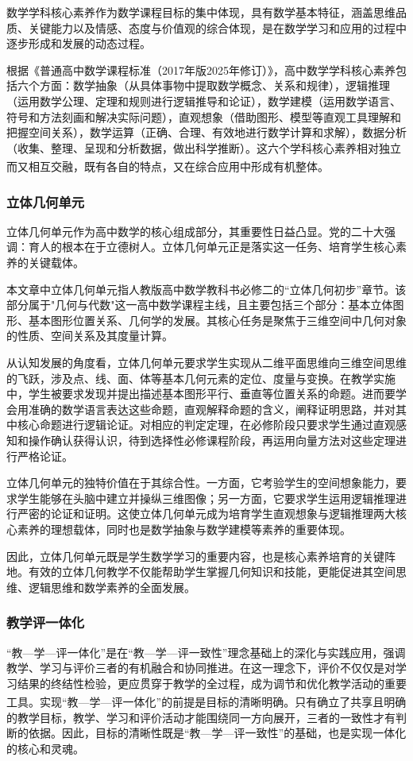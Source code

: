\documentclass[UTF8,a4paper,12pt,twoside]{ctexart}
\begin{document}
数学学科核心素养作为数学课程目标的集中体现，具有数学基本特征，涵盖思维品质、关键能力以及情感、态度与价值观的综合体现，是在数学学习和应用的过程中逐步形成和发展的动态过程。

根据《普通高中数学课程标准（2017年版2025年修订）》，高中数学学科核心素养包括六个方面：数学抽象（从具体事物中提取数学概念、关系和规律），逻辑推理（运用数学公理、定理和规则进行逻辑推导和论证），数学建模（运用数学语言、符号和方法刻画和解决实际问题），直观想象（借助图形、模型等直观工具理解和把握空间关系），数学运算（正确、合理、有效地进行数学计算和求解），数据分析（收集、整理、呈现和分析数据，做出科学推断）。这六个学科核心素养相对独立而又相互交融，既有各自的特点，又在综合应用中形成有机整体\textsuperscript{\cite{gaozhong_kebiao}}。

\subsubsection{立体几何单元}

立体几何单元作为高中数学的核心组成部分，其重要性日益凸显。党的二十大强调：育人的根本在于立德树人。立体几何单元正是落实这一任务、培育学生核心素养的关键载体。

本文章中立体几何单元指人教版高中数学教科书必修二的“立体几何初步”章节。该部分属于"几何与代数"这一高中数学课程主线，且主要包括三个部分：基本立体图形、基本图形位置关系、几何学的发展。其核心任务是聚焦于三维空间中几何对象的性质、空间关系及其度量计算。

从认知发展的角度看，立体几何单元要求学生实现从二维平面思维向三维空间思维的飞跃，涉及点、线、面、体等基本几何元素的定位、度量与变换。在教学实施中，学生被要求发现并提出描述基本图形平行、垂直等位置关系的命题。进而要学会用准确的数学语言表达这些命题，直观解释命题的含义，阐释证明思路，并对其中核心命题进行逻辑论证。对相应的判定定理，在必修阶段只要求学生通过直观感知和操作确认获得认识，待到选择性必修课程阶段，再运用向量方法对这些定理进行严格论证。

立体几何单元的独特价值在于其综合性。一方面，它考验学生的空间想象能力，要求学生能够在头脑中建立并操纵三维图像；另一方面，它要求学生运用逻辑推理进行严密的论证和证明。这使立体几何单元成为培育学生直观想象与逻辑推理两大核心素养的理想载体，同时也是数学抽象与数学建模等素养的重要体现。

因此，立体几何单元既是学生数学学习的重要内容，也是核心素养培育的关键阵地。有效的立体几何教学不仅能帮助学生掌握几何知识和技能，更能促进其空间思维、逻辑思维和数学素养的全面发展。

\subsubsection{教学评一体化}
“教—学—评一体化”是在“教—学—评一致性”理念基础上的深化与实践应用，强调教学、学习与评价三者的有机融合和协同推进。在这一理念下，评价不仅仅是对学习结果的终结性检验，更应贯穿于教学的全过程，成为调节和优化教学活动的重要工具\textsuperscript{\cite{cui_xia2013}}。实现“教—学—评一体化”的前提是目标的清晰明确。只有确立了共享且明确的教学目标，教学、学习和评价活动才能围绕同一方向展开，三者的一致性才有判断的依据。因此，目标的清晰性既是“教—学—评一致性”的基础，也是实现一体化的核心和灵魂。
\end{document}
